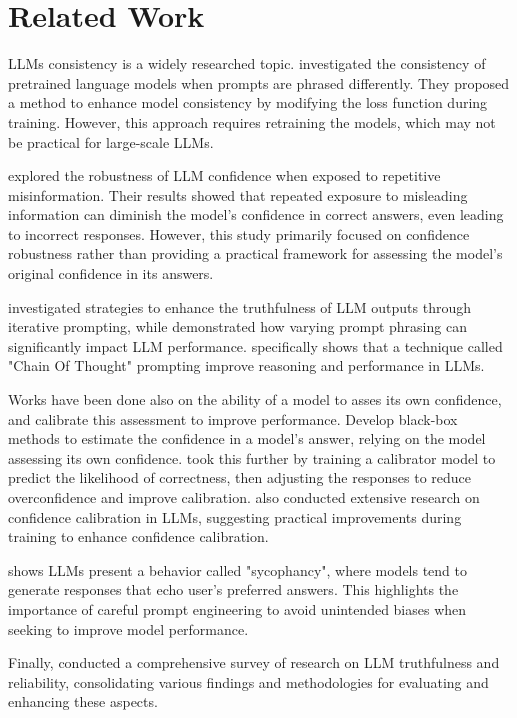 \section{Related Work}


LLMs consistency is a widely researched topic. \cite{elazar2021measuring} investigated the consistency of pretrained language models when prompts are phrased differently. They proposed a method to enhance model consistency by modifying the loss function during training. However, this approach requires retraining the models, which may not be practical for large-scale LLMs.

\cite{xu2023earth} explored the robustness of LLM confidence when exposed to repetitive misinformation. Their results showed that repeated exposure to misleading information can diminish the model’s confidence in correct answers, even leading to incorrect responses. However, this study primarily focused on confidence robustness rather than providing a practical framework for assessing the model's original confidence in its answers.


\cite{krishna2024understanding} investigated strategies to enhance the truthfulness of LLM outputs through iterative prompting, while \cite{salinas2024butterfly} demonstrated how varying prompt phrasing can significantly impact LLM performance. \cite{wei2022chain} specifically shows that a technique called "Chain Of Thought" prompting improve reasoning and performance in LLMs.

Works have been done also on the ability of a model to asses its own confidence, and calibrate this assessment to improve performance. \cite{xiong2024can} Develop black-box methods to estimate the confidence in a model's answer, relying on the model assessing its own confidence. \cite{mielke2022reducing} took this further by training a calibrator model to predict the likelihood of correctness, then adjusting the responses to reduce overconfidence and improve calibration. \cite{guo2017calibration} also conducted extensive research on confidence calibration in LLMs, suggesting practical improvements during training to enhance confidence calibration.

\cite{perez2022discovering} shows LLMs present a behavior called "sycophancy", where models tend to generate responses that echo user's preferred answers. This highlights the importance of careful prompt engineering to avoid unintended biases when seeking to improve model performance.

Finally, \cite{liu2023trustworthy} conducted a comprehensive survey of research on LLM truthfulness and reliability, consolidating various findings and methodologies for evaluating and enhancing these aspects.